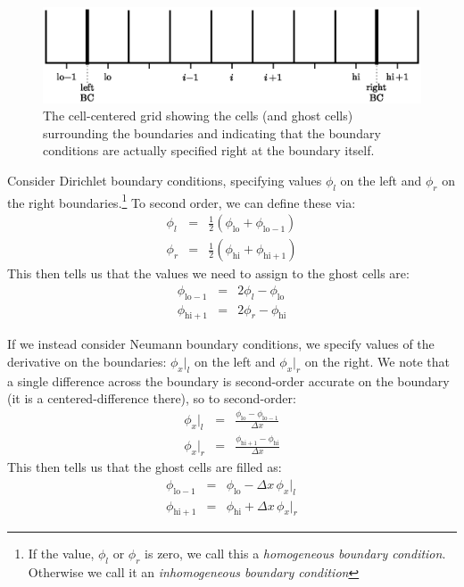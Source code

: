 \begin{figure}[h]
\centering
\includegraphics[width=\linewidth]{mg-bcs}
\caption[The cell-centered grid showing the difference between ghost
  cells and the physical boundary]{\label{fig:bcs} The cell-centered
  grid showing the cells (and ghost cells) surrounding the boundaries
  and indicating that the boundary conditions are actually specified
  right at the boundary itself.}
\end{figure}

Consider Dirichlet boundary conditions, specifying values $\phi_l$ on
the left and $\phi_r$ on the right boundaries.\footnote{If the value, $\phi_l$
  or $\phi_r$ is zero, we call this a {\em homogeneous boundary condition}.  Otherwise
  we call it an {\em inhomogeneous boundary condition}}  To second order, we can
define these via:
\begin{eqnarray}
\phi_l &=& \frac{1}{2} ( \phi_\mathrm{lo} + \phi_\mathrm{lo-1} ) \\
\phi_r &=& \frac{1}{2} ( \phi_\mathrm{hi} + \phi_\mathrm{hi+1} )
\end{eqnarray}
This then tells us that the values we need to assign to the ghost cells are:
\begin{eqnarray}
\label{eq:bc_inhomo_dir}
\phi_\mathrm{lo-1} &=& 2 \phi_l - \phi_\mathrm{lo} \\
\phi_\mathrm{hi+1} &=& 2 \phi_r - \phi_\mathrm{hi}
\end{eqnarray}

If we instead consider Neumann boundary conditions, we specify values
of the derivative on the boundaries: $\phi_x |_l$ on the left and
$\phi_x |_r$ on the right.  We note that a single difference across
the boundary is second-order accurate on the boundary (it is a
centered-difference there), so to second-order:
\begin{eqnarray}
\phi_x |_l &=& \frac{\phi_\mathrm{lo} - \phi_\mathrm{lo-1}}{\Delta x} \\
\phi_x |_r &=& \frac{\phi_\mathrm{hi+1} - \phi_\mathrm{hi}}{\Delta x}
\end{eqnarray}
This then tells us that the ghost cells are filled as:
\begin{eqnarray}
\label{eq:bc_inhomo_neum}
\phi_\mathrm{lo-1} &=& \phi_\mathrm{lo} - \Delta x \, \phi_x |_l \\
\phi_\mathrm{hi+1} &=& \phi_\mathrm{hi} + \Delta x \, \phi_x |_r
\end{eqnarray}


